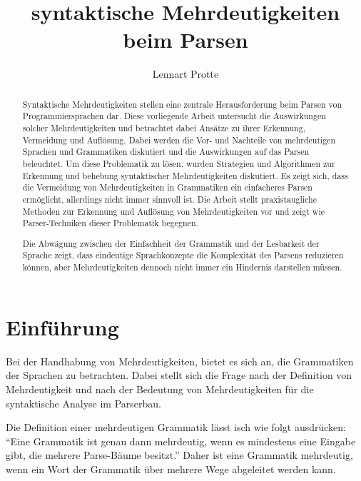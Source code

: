 \documentclass[runningheads]{llncs}
\begin{document}
%
	\title{syntaktische Mehrdeutigkeiten beim Parsen}
%
%
	\author{Lennart Protte}
%
%
%
	\maketitle              %
%
	\begin{abstract}
		Syntaktische Mehrdeutigkeiten stellen eine zentrale Herausforderung beim Parsen von Programmiersprachen dar.
		Diese vorliegende Arbeit untersucht die Auswirkungen solcher Mehrdeutigkeiten
		und betrachtet dabei Ansätze zu ihrer Erkennung, Vermeidung und Auflösung.
		Dabei werden die Vor- und Nachteile von mehrdeutigen Sprachen und Grammatiken diskutiert
		und die Auswirkungen auf das Parsen beleuchtet.
		Um diese Problematik zu lösen,
		wurden Strategien und Algorithmen zur Erkennung und behebung syntaktischer Mehrdeutigkeiten diskutiert.
		Es zeigt sich, dass die Vermeidung von Mehrdeutigkeiten in Grammatiken
		ein einfacheres Parsen ermöglicht, allerdings nicht immer sinnvoll ist.
		Die Arbeit stellt praxistaugliche Methoden zur Erkennung und Auflösung von Mehrdeutigkeiten vor
		und zeigt wie Parser-Techniken dieser Problematik begegnen.

		Die Abwägung zwischen der Einfachheit der Grammatik und der Lesbarkeit der Sprache zeigt,
		dass eindeutige Sprachkonzepte die Komplexität des Parsens reduzieren können,
		aber Mehrdeutigkeiten dennoch nicht immer ein Hindernis darstellen müssen.

	\end{abstract}


	\section{Einführung}\label{sec:einfuhrung}
	Bei der Handhabung von Mehrdeutigkeiten, bietet es sich an, die Grammatiken der Sprachen zu betrachten.
	Dabei stellt sich die Frage nach der Definition von Mehrdeutigkeit
	und nach der Bedeutung von Mehrdeutigkeiten für die syntaktische Analyse im Parserbau.

	Die Definition einer mehrdeutigen Grammatik lässt isch wie folgt ausdrücken:
	``Eine Grammatik ist genau dann mehrdeutig, wenn es mindestens eine Eingabe gibt, die mehrere Parse-Bäume besitzt.''
	Daher ist eine Grammatik mehrdeutig, wenn ein Wort der Grammatik über mehrere Wege abgeleitet werden kann.
\end{document}
